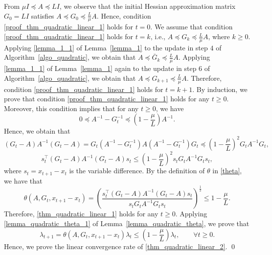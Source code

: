 \documentclass[11pt]{article}
\numberwithin{assumption}{section}
\numberwithin{remark}{section}
\numberwithin{theorem}{section}
\begin{document}
From $\mu I \preceq A \preceq LI$, we observe that the initial Hessian approximation matrix $G_0 = LI$ satisfies $A \preceq G_0 \preceq \frac{L}{\mu}A$. Hence, condition \eqref{proof_thm_quadratic_linear_1} holds for $t = 0$. We assume that condition \eqref{proof_thm_quadratic_linear_1} holds for $t = k$, i.e., $A \preceq G_k \preceq \frac{L}{\mu}A$, where $k \geq 0$. Applying \eqref{lemma_1_1} of Lemma~\ref{lemma_1} to the update in step $4$ of Algorithm~\ref{algo_quadratic}, we obtain that $A \preceq \bar{G}_k \preceq \frac{L}{\mu}A$. Applying \eqref{lemma_1_1} of Lemma~\ref{lemma_1} again to the update in step $6$ of Algorithm~\ref{algo_quadratic}, we obtain that $A \preceq G_{k+1} \preceq \frac{L}{\mu}A$. Therefore, condition \eqref{proof_thm_quadratic_linear_1} holds for $t = k + 1$. By induction, we prove that condition \eqref{proof_thm_quadratic_linear_1} holds for any $t \geq 0$. Moreover, this condition implies that for any $t \geq 0$, we have
\begin{equation}
    0 \preceq A^{-1} - G_{t}^{-1} \preceq (1 - \frac{\mu}{L})A^{-1}.
\end{equation}
Hence, we obtain that
\begin{equation}
(G_t - A)A^{-1}(G_t - A) = G_t(A^{-1} - G_t^{-1})A(A^{-1} - G_t^{-1})G_t \preceq (1 - \frac{\mu}{L})^2G_t A^{-1}G_t,
\end{equation}
\begin{equation}
s_t^\top (G_t - A)A^{-1}(G_t - A)s_t \leq (1 - \frac{\mu}{L})^2 s_t G_t A^{-1}G_t s_t,
\end{equation}
where $s_t = x_{t + 1} - x_t$ is the variable difference. By the definition of $\theta$ in \eqref{theta}, we have that
\begin{equation}
\theta(A, G_t, x_{t + 1} - x_{t}) = \left(\frac{s_t^\top (G_t - A)A^{-1}(G_t - A)s_t}{s_t G_t A^{-1}G_t s_t}\right)^{\frac{1}{2}} \leq 1 - \frac{\mu}{L}.
\end{equation}
Therefore, \eqref{thm_quadratic_linear_1} holds for any $t \geq 0$. Applying \eqref{lemma_quadratic_theta_1} of Lemma~\ref{lemma_quadratic_theta}, we prove that
\begin{equation}
 \lambda_{t + 1} = \theta(A, G_t, x_{t + 1} - x_{t})\lambda_{t} \leq (1 - \frac{\mu}{L}) \lambda_{t}, \qquad \forall t \geq 0.
\end{equation}
Hence, we prove the linear convergence rate of \eqref{thm_quadratic_linear_2}. \hfill \qed
\end{document}
